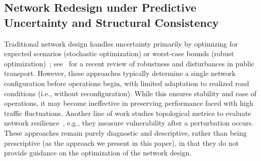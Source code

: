 \documentclass[a4paper,fleqn]{cas-sc}
\begin{document}
\subsection{Network Redesign under Predictive Uncertainty and Structural Consistency}
\label{sec:proactive}

Traditional network design handles uncertainty primarily by optimizing for expected scenarios (stochastic optimization) or worst-case bounds (robust optimization)~\citep{bertsimas2018data, wang2020robust}; see~\cite{ge2022robustness} for a recent review of robustness and disturbances in public transport.
However, these approaches typically determine a single network configuration before operations begin, with limited adaptation to realized road conditions (i.e., without reconfiguration). While this ensures stability and ease of operations, it may become ineffective in preserving performance faced with high traffic fluctuations.
%
%
Another line of work studies topological metrics to evaluate network resilience~\citep{Massobrio2024, Pu2022}, e.g., they measure vulnerability after a perturbation occurs. These approaches remain purely diagnostic and descriptive, rather than being prescriptive (as the approach we present in this paper), in that they do not provide guidance on the optimization of the network design. 
%

%
\end{document}
